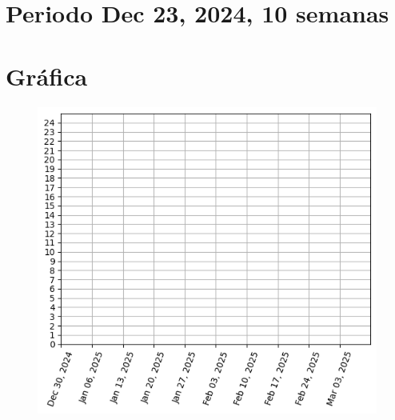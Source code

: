 \documentclass[a4paper,12pt, tikz]{scrartcl}
\begin{document}
 
\section*{Periodo Dec 23, 2024, 10 semanas }

\newpage

\section*{Gráfica}

\begin{figure}[H]
\centering
\includegraphics[scale=1]{graph.png}
\end{figure}

  \newpage
  $\;$
  \newpage
\end{document}

